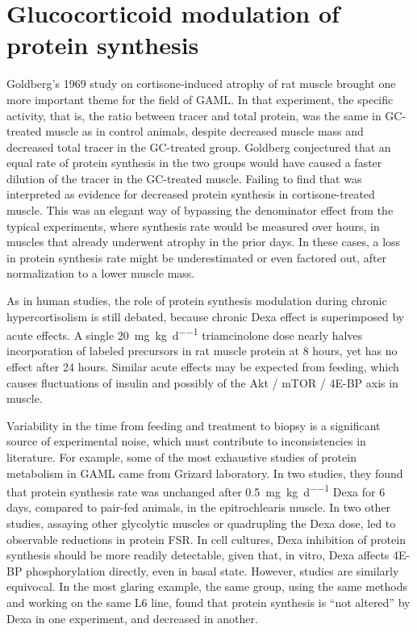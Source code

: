 \documentclass[12pt,english]{report}\usepackage[]{graphicx}\usepackage[]{color}
\begin{document}
\section{Glucocorticoid modulation of protein synthesis}

Goldberg's\citep{goldberg1969protein} 1969 study on cortisone-induced
atrophy of rat muscle brought one more important theme for the field
of GAML. In that experiment, the specific activity, that is, the ratio
between tracer and total protein, was the same in GC-treated muscle
as in control animals, despite decreased muscle mass and decreased
total tracer in the GC-treated group. Goldberg conjectured that an
equal rate of protein synthesis in the two groups would have caused
a faster dilution of the tracer in the GC-treated muscle. Failing
to find that was interpreted as evidence for decreased protein synthesis
in cortisone-treated muscle. This was an elegant way of bypassing
the denominator effect from the typical experiments, where synthesis
rate would be measured over hours, in muscles that already underwent
atrophy in the prior days. In these cases, a loss in protein synthesis
rate might be underestimated or even factored out, after normalization
to a lower muscle mass.

As in human studies, the role of protein synthesis modulation during
chronic hypercortisolism is still debated, because chronic Dexa effect
is superimposed by acute effects. A single \SI{20}{\milli\gram\per\kilo\gram\per\day}
triamcinolone dose nearly halves incorporation of labeled precursors
in rat muscle protein at 8 hours, yet has no effect after 24 hours\citep{peters1970biochemical}.
Similar acute effects may be expected from feeding, which causes fluctuations
of insulin and possibly of the Akt / mTOR / 4E-BP axis in muscle.

Variability in the time from feeding and treatment to biopsy is a
significant source of experimental noise, which must contribute to
inconsistencies in literature. For example, some of the most exhaustive
studies of protein metabolism in GAML came from Grizard laboratory.
In two studies, they found that protein synthesis rate was unchanged
after \SI{0.5}{\milli\gram\per\kilo\gram\per\day} Dexa for 6 days,
compared to pair-fed animals, in the epitrochlearis muscle\citep{dardevet1995sensitivity,rieu2004glucocorticoid}.
In two other studies, assaying other glycolytic muscles or quadrupling
the Dexa dose, led to observable reductions in protein FSR\citep{savary1998effect,dardevet1999glucocorticoid-induced}.
In cell cultures, Dexa inhibition of protein synthesis should be more
readily detectable, given that, in vitro, Dexa affects 4E-BP phosphorylation
directly, even in basal state\citep{shah2000glucocorticoidsa}. However,
studies are similarly equivocal. In the most glaring example, the
same group, using the same methods and working on the same L6 line,
found that protein synthesis is ``not altered'' by Dexa in one experiment,
and decreased in another\citep{menconi2008dexamethasone,aversa2012beta-hydroxy-beta-methylbutyrate}.
\end{document}
